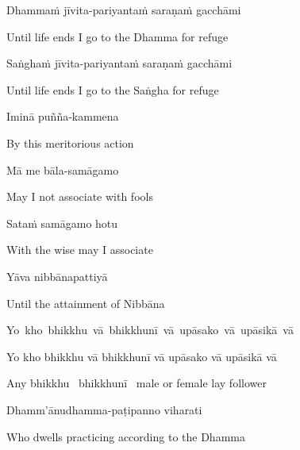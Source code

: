 Dhammaṁ jīvita-pariyantaṁ saraṇaṁ gacchāmi

\begin{english}
  Until life ends I go to the Dhamma for refuge
\end{english}

Saṅghaṁ jīvita-pariyantaṁ saraṇaṁ gacchāmi

\begin{english}
  Until life ends I go to the Saṅgha for refuge
\end{english}

Iminā puñña-kammena

\begin{english}
  By this meritorious action
\end{english}

Mā me bāla-samāgamo

\begin{english}
  May I not associate with fools
\end{english}

Sataṁ samāgamo hotu

\begin{english}
  With the wise may I associate
\end{english}

Yāva nibbānapattiyā

\begin{english}
  Until the attainment of Nibbāna
\end{english}


\ifninebythirteen

\clearpage

\mbox{Yo kho bhikkhu vā bhikkhunī vā upāsako vā upāsikā vā}

\else

\begin{pali-hang}
Yo kho bhikkhu vā bhikkhunī vā upāsako vā upāsikā vā
\end{pali-hang}

\fi

\begin{english}
  Any bhikkhu \breathmark\ bhikkhunī \breathmark\ male or female lay follower
\end{english}

Dhamm'ānudhamma-paṭipanno viharati

\begin{english}
  Who dwells practicing according to the Dhamma
\end{english}

